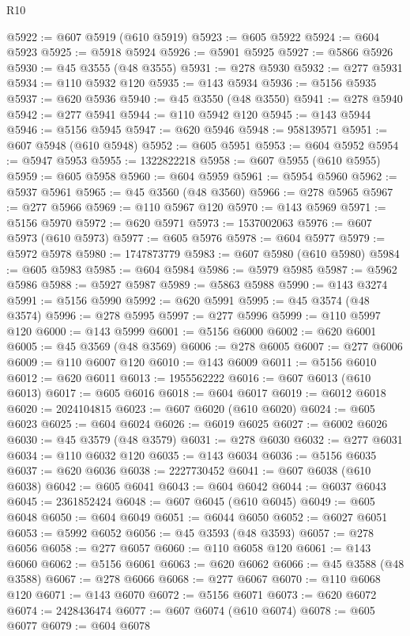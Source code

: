 \begin{lexlean}{R10}
\begin{coremodule}
@5922 := @607 @5919 (@610 @5919)
@5923 := @605 @5922
@5924 := @604 @5923
@5925 := @5918 @5924
@5926 := @5901 @5925
@5927 := @5866 @5926
@5930 := @45 @3555 (@48 @3555)
@5931 := @278 @5930
@5932 := @277 @5931
@5934 := @110 @5932 @120
@5935 := @143 @5934
@5936 := @5156 @5935
@5937 := @620 @5936
@5940 := @45 @3550 (@48 @3550)
@5941 := @278 @5940
@5942 := @277 @5941
@5944 := @110 @5942 @120
@5945 := @143 @5944
@5946 := @5156 @5945
@5947 := @620 @5946
@5948 := 958139571
@5951 := @607 @5948 (@610 @5948)
@5952 := @605 @5951
@5953 := @604 @5952
@5954 := @5947 @5953
@5955 := 1322822218
@5958 := @607 @5955 (@610 @5955)
@5959 := @605 @5958
@5960 := @604 @5959
@5961 := @5954 @5960
@5962 := @5937 @5961
@5965 := @45 @3560 (@48 @3560)
@5966 := @278 @5965
@5967 := @277 @5966
@5969 := @110 @5967 @120
@5970 := @143 @5969
@5971 := @5156 @5970
@5972 := @620 @5971
@5973 := 1537002063
@5976 := @607 @5973 (@610 @5973)
@5977 := @605 @5976
@5978 := @604 @5977
@5979 := @5972 @5978
@5980 := 1747873779
@5983 := @607 @5980 (@610 @5980)
@5984 := @605 @5983
@5985 := @604 @5984
@5986 := @5979 @5985
@5987 := @5962 @5986
@5988 := @5927 @5987
@5989 := @5863 @5988
@5990 := @143 @3274
@5991 := @5156 @5990
@5992 := @620 @5991
@5995 := @45 @3574 (@48 @3574)
@5996 := @278 @5995
@5997 := @277 @5996
@5999 := @110 @5997 @120
@6000 := @143 @5999
@6001 := @5156 @6000
@6002 := @620 @6001
@6005 := @45 @3569 (@48 @3569)
@6006 := @278 @6005
@6007 := @277 @6006
@6009 := @110 @6007 @120
@6010 := @143 @6009
@6011 := @5156 @6010
@6012 := @620 @6011
@6013 := 1955562222
@6016 := @607 @6013 (@610 @6013)
@6017 := @605 @6016
@6018 := @604 @6017
@6019 := @6012 @6018
@6020 := 2024104815
@6023 := @607 @6020 (@610 @6020)
@6024 := @605 @6023
@6025 := @604 @6024
@6026 := @6019 @6025
@6027 := @6002 @6026
@6030 := @45 @3579 (@48 @3579)
@6031 := @278 @6030
@6032 := @277 @6031
@6034 := @110 @6032 @120
@6035 := @143 @6034
@6036 := @5156 @6035
@6037 := @620 @6036
@6038 := 2227730452
@6041 := @607 @6038 (@610 @6038)
@6042 := @605 @6041
@6043 := @604 @6042
@6044 := @6037 @6043
@6045 := 2361852424
@6048 := @607 @6045 (@610 @6045)
@6049 := @605 @6048
@6050 := @604 @6049
@6051 := @6044 @6050
@6052 := @6027 @6051
@6053 := @5992 @6052
@6056 := @45 @3593 (@48 @3593)
@6057 := @278 @6056
@6058 := @277 @6057
@6060 := @110 @6058 @120
@6061 := @143 @6060
@6062 := @5156 @6061
@6063 := @620 @6062
@6066 := @45 @3588 (@48 @3588)
@6067 := @278 @6066
@6068 := @277 @6067
@6070 := @110 @6068 @120
@6071 := @143 @6070
@6072 := @5156 @6071
@6073 := @620 @6072
@6074 := 2428436474
@6077 := @607 @6074 (@610 @6074)
@6078 := @605 @6077
@6079 := @604 @6078

\end{coremodule}
\end{lexlean}
